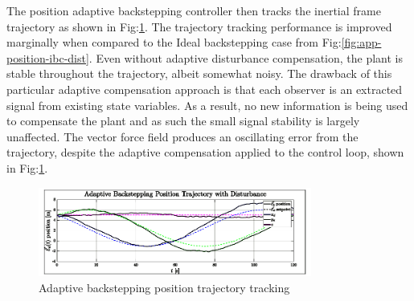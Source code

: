 The position adaptive backstepping controller then tracks the inertial frame trajectory as shown in Fig:\ref{fig:ABC_Position_Trajectory}. The trajectory tracking performance is improved marginally when compared to the Ideal backstepping case from Fig:\ref{fig:app-position-ibc-dist}. Even without adaptive disturbance compensation, the plant is stable throughout the trajectory, albeit somewhat noisy. The drawback of this particular adaptive compensation approach is that each observer is an extracted signal from existing state variables. As a result, no new information is being used to compensate the plant and as such the small signal stability is largely unaffected. The vector force field produces an oscillating error from the trajectory, despite the adaptive compensation applied to the control loop, shown in Fig:\ref{fig:ABC_Position_Trajectory}.
\begin{figure}[hbtp]
\vspace{-6pt}
\centering
\includegraphics[width=0.8\textwidth]{graphs/ABC_Position_Trajectory}
\vspace{-12pt}
\caption{Adaptive backstepping position trajectory tracking}
\label{fig:ABC_Position_Trajectory}
\vspace{-16pt}
\end{figure}
